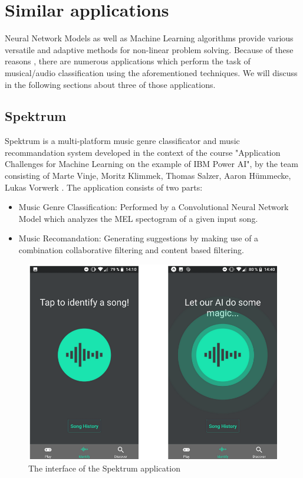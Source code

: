 \chapter{Similar applications}

Neural Network Models as well as Machine Learning algorithms provide various versatile and adaptive methods for non-linear problem solving. Because of these reasons , there are numerous applications which perform the task of musical/audio classification using the aforementioned techniques. We will discuss in the following sections about three of those applications.

\section{Spektrum}

Spektrum is a multi-platform music genre classificator and music recommandation system developed in the context of the course "Application Challenges for
Machine Learning on the example of IBM Power AI", by the team consisting of Marte Vinje, Moritz Klimmek, Thomas Salzer, Aaron Hümmecke, Lukas Vorwerk \cite{spektrum} . The application consists of two parts:
\begin{itemize}
	\item Music Genre Classification: Performed by a Convolutional Neural Network Model which analyzes the MEL spectogram of a given input song.
	\item Music Recomandation: Generating suggestions by making use of a combination collaborative filtering
		and content based filtering.
\end{itemize}

\begin{figure}[H]
	\centering
	\includegraphics{images/spektrum.png}
	\caption{The interface of the Spektrum application}
\label{spektrum}
\end{figure}


